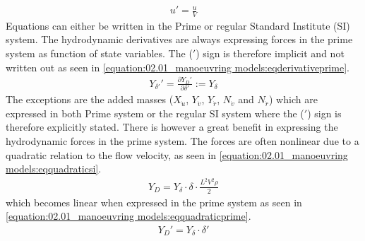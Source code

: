 \begin{equation}\label{equation:02.01_manoeuvring models:eqprime}
\begin{split}\displaystyle u'=\frac{u}{V}\end{split}
\end{equation}
\sphinxAtStartPar
Equations can either be written in the Prime or regular Standard Institute (SI) system. The hydrodynamic derivatives are always expressing forces in the prime system as function of state variables. The (\('\)) sign is therefore implicit and not written out as seen in \autoref{equation:02.01_manoeuvring models:eqderivativeprime}.
\begin{equation}\label{equation:02.01_manoeuvring models:eqderivativeprime}
\begin{split}\displaystyle Y_{\delta'}'=\frac{\partial Y_D'}{\partial \delta'} := Y_{\delta} \end{split}
\end{equation}
\sphinxAtStartPar
The exceptions are the added masses (\(X_{\dot{u}}\), \(Y_{\dot{v}}\), \(Y_{\dot{r}}\), \(N_{\dot{v}}\) and \(N_{\dot{r}}\)) which are expressed in both Prime system or the regular SI system where the (\('\)) sign is therefore
explicitly stated.
There is however a great benefit in expressing the hydrodynamic forces in the prime system. The forces are often nonlinear due to a quadratic relation to the flow velocity, as seen in \autoref{equation:02.01_manoeuvring models:eqquadraticsi}.
\begin{equation}\label{equation:02.01_manoeuvring models:eqquadraticsi}
\begin{split}\displaystyle Y_{D}=Y_{\delta} \cdot \delta \cdot \frac{L^2V^2\rho}{2}\end{split}
\end{equation}
which becomes linear when expressed in the prime system as seen in \autoref{equation:02.01_manoeuvring models:eqquadraticprime}.
\begin{equation}\label{equation:02.01_manoeuvring models:eqquadraticprime}
\begin{split}\displaystyle Y_{D}'=Y_{\delta} \cdot \delta'\end{split}
\end{equation}